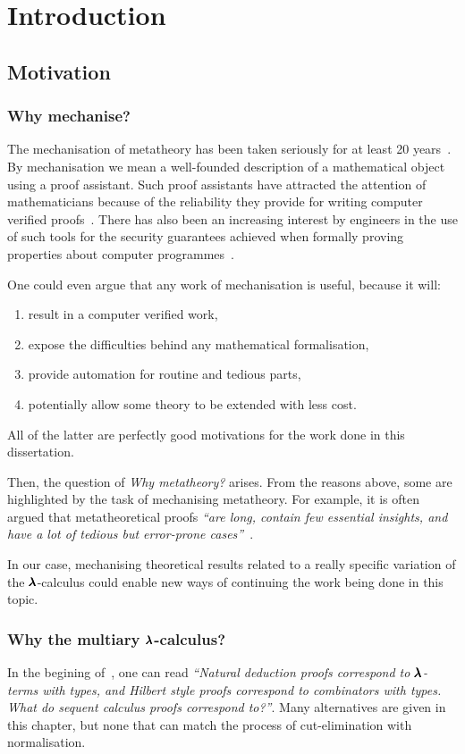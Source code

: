 \chapter{Introduction}
\label{c:intro}

\section{Motivation}


\subsection{Why mechanise?}
The mechanisation of metatheory has been taken seriously for at least 20 years~\cite{POPLmark}.
By mechanisation we mean a well-founded description of a mathematical object using a proof assistant.
Such proof assistants have attracted the attention of mathematicians because of the reliability they provide for writing computer verified proofs~\cite{FourColourThm}.
There has also been an increasing interest by engineers in the use of such tools for the security guarantees achieved when formally proving properties about computer programmes~\cite{CompCert}.

One could even argue that any work of mechanisation is useful, because it will:
\begin{enumerate}
\item result in a computer verified work,
\item expose the difficulties behind any mathematical formalisation,
\item provide automation for routine and tedious parts,
\item potentially allow some theory to be extended with less cost.
\end{enumerate}

All of the latter are perfectly good motivations for the work done in this dissertation.

Then, the question of \textit{Why metatheory?} arises.
From the reasons above, some are highlighted by the task of mechanising metatheory.
For example, it is often argued that metatheoretical proofs \textit{``are long, contain few essential insights, and have a lot of tedious but error-prone cases''}~\cite{AutosubstSchafer}.

In our case, mechanising theoretical results related to a really specific variation of the $\pmb{\lambda}$-calculus could enable new ways of continuing the work being done in this topic.

\subsection{Why the multiary $\pmb{\lambda}$-calculus?}
In the begining of~\cite[Chapter~7.3]{CurryHoward}, one can read \textit{``Natural deduction proofs correspond to $\pmb{\lambda}$-terms with types, and Hilbert style proofs correspond to combinators with types. What do sequent calculus proofs correspond to?''}.
Many alternatives are given in this chapter, but none that can match the process of cut-elimination with normalisation.


